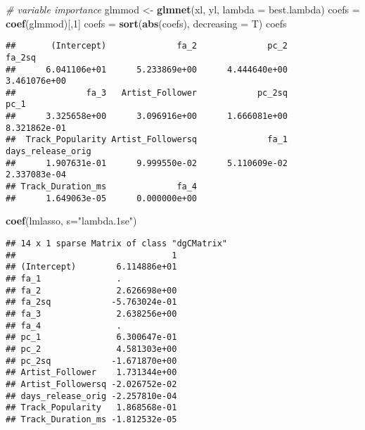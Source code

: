 \documentclass[
]{article}
\newenvironment{Shaded}{\begin{snugshade}}{\end{snugshade}}
\newcommand{\CommentTok}[1]{\textcolor[rgb]{0.56,0.35,0.01}{\textit{#1}}}
\newcommand{\DataTypeTok}[1]{\textcolor[rgb]{0.13,0.29,0.53}{#1}}
\newcommand{\DecValTok}[1]{\textcolor[rgb]{0.00,0.00,0.81}{#1}}
\newcommand{\KeywordTok}[1]{\textcolor[rgb]{0.13,0.29,0.53}{\textbf{#1}}}
\newcommand{\NormalTok}[1]{#1}
\newcommand{\OperatorTok}[1]{\textcolor[rgb]{0.81,0.36,0.00}{\textbf{#1}}}
\newcommand{\StringTok}[1]{\textcolor[rgb]{0.31,0.60,0.02}{#1}}
\begin{document}
\begin{Shaded}
\begin{Highlighting}[]
\CommentTok{# variable importance}
\NormalTok{glmmod <-}\StringTok{ }\KeywordTok{glmnet}\NormalTok{(xl, yl, }\DataTypeTok{lambda =}\NormalTok{ best.lambda)}
\NormalTok{coefs =}\StringTok{ }\KeywordTok{coef}\NormalTok{(glmmod)[,}\DecValTok{1}\NormalTok{]}
\NormalTok{coefs =}\StringTok{ }\KeywordTok{sort}\NormalTok{(}\KeywordTok{abs}\NormalTok{(coefs), }\DataTypeTok{decreasing =}\NormalTok{ T)}
\NormalTok{coefs}
\end{Highlighting}
\end{Shaded}

\begin{verbatim}
##       (Intercept)              fa_2              pc_2            fa_2sq 
##      6.041106e+01      5.233869e+00      4.444640e+00      3.461076e+00 
##              fa_3   Artist_Follower            pc_2sq              pc_1 
##      3.325658e+00      3.096916e+00      1.666081e+00      8.321862e-01 
##  Track_Popularity Artist_Followersq              fa_1 days_release_orig 
##      1.907631e-01      9.999550e-02      5.110609e-02      2.337083e-04 
## Track_Duration_ms              fa_4 
##      1.649063e-05      0.000000e+00
\end{verbatim}

\begin{Shaded}
\begin{Highlighting}[]
\KeywordTok{coef}\NormalTok{(lmlasso, }\DataTypeTok{s=}\StringTok{"lambda.1se"}\NormalTok{)}
\end{Highlighting}
\end{Shaded}

\begin{verbatim}
## 14 x 1 sparse Matrix of class "dgCMatrix"
##                               1
## (Intercept)        6.114886e+01
## fa_1               .           
## fa_2               2.626698e+00
## fa_2sq            -5.763024e-01
## fa_3               2.638256e+00
## fa_4               .           
## pc_1               6.300647e-01
## pc_2               4.581303e+00
## pc_2sq            -1.671870e+00
## Artist_Follower    1.731344e+00
## Artist_Followersq -2.026752e-02
## days_release_orig -2.257810e-04
## Track_Popularity   1.868568e-01
## Track_Duration_ms -1.812532e-05
\end{verbatim}

\begin{Shaded}
\end{Shaded}
\end{document}
